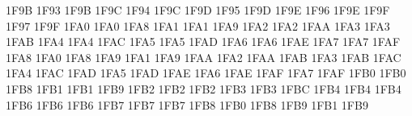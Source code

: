 \setcclcuc 1F9B 1F93 1F9B %
\setcclcuc 1F9C 1F94 1F9C %
\setcclcuc 1F9D 1F95 1F9D %
\setcclcuc 1F9E 1F96 1F9E %
\setcclcuc 1F9F 1F97 1F9F %
\setcclcuc 1FA0 1FA0 1FA8 %
\setcclcuc 1FA1 1FA1 1FA9 %
\setcclcuc 1FA2 1FA2 1FAA %
\setcclcuc 1FA3 1FA3 1FAB %
\setcclcuc 1FA4 1FA4 1FAC %
\setcclcuc 1FA5 1FA5 1FAD %
\setcclcuc 1FA6 1FA6 1FAE %
\setcclcuc 1FA7 1FA7 1FAF %
\setcclcuc 1FA8 1FA0 1FA8 %
\setcclcuc 1FA9 1FA1 1FA9 %
\setcclcuc 1FAA 1FA2 1FAA %
\setcclcuc 1FAB 1FA3 1FAB %
\setcclcuc 1FAC 1FA4 1FAC %
\setcclcuc 1FAD 1FA5 1FAD %
\setcclcuc 1FAE 1FA6 1FAE %
\setcclcuc 1FAF 1FA7 1FAF %
\setcclcuc 1FB0 1FB0 1FB8 %
\setcclcuc 1FB1 1FB1 1FB9 %
\setcclcuc 1FB2 1FB2 1FB2 %
\setcclcuc 1FB3 1FB3 1FBC %
\setcclcuc 1FB4 1FB4 1FB4 %
\setcclcuc 1FB6 1FB6 1FB6 %
\setcclcuc 1FB7 1FB7 1FB7 %
\setcclcuc 1FB8 1FB0 1FB8 %
\setcclcuc 1FB9 1FB1 1FB9 %
